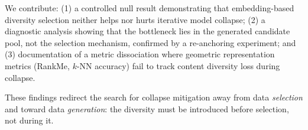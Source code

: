 \documentclass[11pt]{article}
\begin{document}
We contribute: (1) a controlled null result demonstrating that embedding-based diversity selection neither helps nor hurts iterative model collapse; (2) a diagnostic analysis showing that the bottleneck lies in the generated candidate pool, not the selection mechanism, confirmed by a re-anchoring experiment; and (3) documentation of a metric dissociation where geometric representation metrics (RankMe, $k$-NN accuracy) fail to track content diversity loss during collapse.

These findings redirect the search for collapse mitigation away from data \emph{selection} and toward data \emph{generation}: the diversity must be introduced before selection, not during it.



\end{document}
